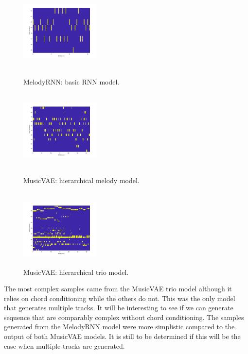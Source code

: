 \documentclass{article}
\begin{document}
\begin{figure}[htb!]
  \begin{minipage}{0.48\textwidth}
    \centering
    \includegraphics[height=4cm, width=4cm]{melody_rnn.png}
    \caption{MelodyRNN: basic RNN model.}
  \end{minipage}
  \begin{minipage}{0.48\textwidth}
    \centering
    \includegraphics[height=4cm, width=4cm]{musicvae_melody.png}
    \caption{MusicVAE: hierarchical melody model.}
  \end{minipage}\hfill
  \begin{minipage}{0.48\textwidth}
    \centering
    \includegraphics[height=4cm, width=4cm]{musicvae_trio.png}
    \caption{MusicVAE: hierarchical trio model.}
  \end{minipage}
\end{figure}

The most complex samples came from the MusicVAE trio model although it relies on chord conditioning while the others do not. This was the only model that generates multiple tracks. It will be interesting to see if we can generate sequence that are comparably complex without chord conditioning. The samples generated from the MelodyRNN model were more simplistic compared to the output of both MusicVAE models. It is still to be determined if this will be the case when multiple tracks are generated.
\end{document}
